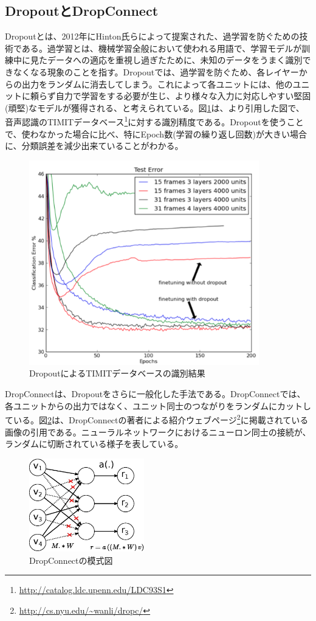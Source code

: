 \subsection{DropoutとDropConnect}
\label{c3_dropout}
Dropoutとは、2012年にHinton氏らによって提案された、過学習を防ぐための技術である\cite{hinton2012improving}。過学習とは、機械学習全般において使われる用語で、学習モデルが訓練中に見たデータへの適応を重視し過ぎたために、未知のデータをうまく識別できなくなる現象のことを指す。Dropoutでは、過学習を防ぐため、各レイヤーからの出力をランダムに消去してしまう。これによって各ユニットには、他のユニットに頼らず自力で学習をする必要が生じ、より様々な入力に対応しやすい堅固(頑堅)なモデルが獲得される、と考えられている。図\ref{c3_dropout_timit}は、\cite{hinton2012improving}より引用した図で、音声認識のTIMITデータベース\cite{fisher1986darpa}\footnote{\url{http://catalog.ldc.upenn.edu/LDC93S1}}に対する識別精度である。Dropoutを使うことで、使わなかった場合に比べ、特にEpoch数(学習の繰り返し回数)が大きい場合に、分類誤差を減少出来ていることがわかる。
\begin{figure}[tbp]
 \centering
  \includegraphics[width=100mm]{img/c3/dropout_timit}
 \caption{DropoutによるTIMITデータベースの識別結果}
 \label{c3_dropout_timit}
\end{figure}
\par
DropConnectは、Dropoutをさらに一般化した手法である。DropConnectでは、各ユニットからの出力ではなく、ユニット同士のつながりをランダムにカットしている。図\ref{c3_dropconnect}は、DropConnectの著者による紹介ウェブページ\footnote{\url{http://cs.nyu.edu/~wanli/dropc/}}に掲載されている画像の引用である。ニューラルネットワークにおけるニューロン同士の接続が、ランダムに切断されている様子を表している。
\begin{figure}[tbp]
 \begin{center}
  \includegraphics[width=50mm]{img/c3/nn_dc}
 \end{center}
 \caption{DropConnectの模式図}
 \label{c3_dropconnect}
\end{figure}

